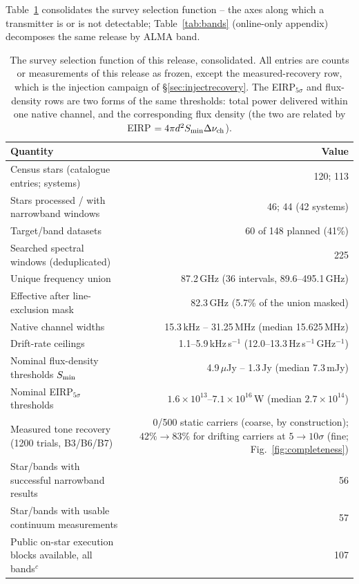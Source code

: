 \documentclass{openjournal}
\begin{document}
Table~\ref{tab:searchspace} consolidates the survey selection
function -- the axes along which a transmitter is or is not
detectable; Table~\ref{tab:bands} (online-only appendix) decomposes
the same release by ALMA band.

\begin{table}
\centering
\small
\setlength{\tabcolsep}{4pt}
\caption{The survey selection function of this release, consolidated.
All entries are counts or measurements of this release as frozen,
except the measured-recovery row, which is the injection campaign of
\S\ref{sec:injectrecovery}. The
EIRP$_{5\sigma}$ and flux-density rows are two forms of the same
thresholds: total power delivered within one native channel, and the
corresponding flux density (the two are related by
EIRP $= 4\pi d^{2} S_{\rm min} \Delta\nu_{\rm ch}$).}
\label{tab:searchspace}
\begin{tabular}{@{}l r@{}}
\hline
Quantity & Value \\
\hline
Census stars (catalogue entries; systems) & 120; 113 \\
Stars processed / with narrowband windows & 46; 44 (42 systems) \\
Target/band datasets & 60 of 148 planned (41\%) \\
Searched spectral windows (deduplicated) & 225 \\
Unique frequency union & 87.2\,GHz (36 intervals, 89.6--495.1\,GHz) \\
Effective after line-exclusion mask & 82.3\,GHz (5.7\% of the union masked) \\
Native channel widths & 15.3\,kHz -- 31.25\,MHz (median 15.625\,MHz) \\
Drift-rate ceilings & 1.1--5.9\,kHz\,s$^{-1}$ (12.0--13.3\,Hz\,s$^{-1}$\,GHz$^{-1}$) \\
Nominal flux-density thresholds $S_{\rm min}$ & 4.9\,$\mu$Jy -- 1.3\,Jy (median 7.3\,mJy) \\
Nominal EIRP$_{5\sigma}$ thresholds & $1.6\times10^{13}$--$7.1\times10^{16}$\,W (median $2.7\times10^{14}$) \\
Measured tone recovery (1200 trials, B3/B6/B7) & 0/500 static carriers (coarse, by construction); $42\%\rightarrow83\%$ for drifting carriers at $5\rightarrow10\sigma$ (fine; Fig.~\ref{fig:completeness}) \\
Star/bands with successful narrowband results & 56 \\
Star/bands with usable continuum measurements & 57 \\
Public on-star execution blocks available, all bands$^{c}$ & 107 \\

\end{tabular}
\end{table}
\end{document}
